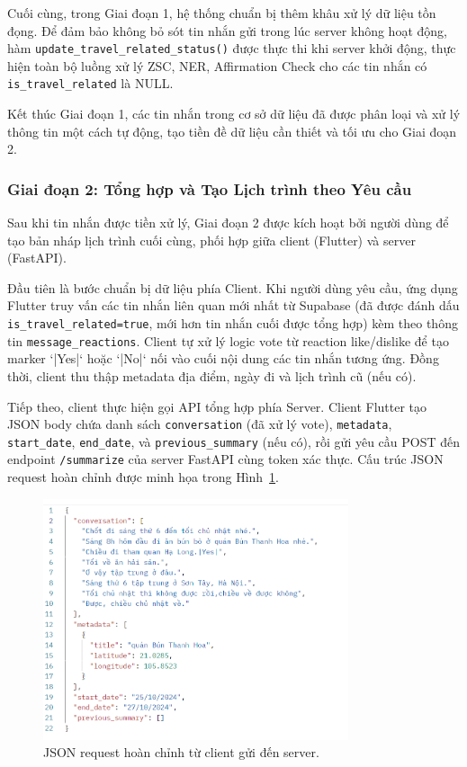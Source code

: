 Cuối cùng, trong Giai đoạn 1, hệ thống chuẩn bị thêm khâu xử lý dữ liệu tồn đọng. Để đảm bảo không bỏ sót tin nhắn gửi trong lúc server không hoạt động, hàm \texttt{update\_travel\_related\_status()} được thực thi khi server khởi động, thực hiện toàn bộ luồng xử lý ZSC, NER, Affirmation Check cho các tin nhắn có \texttt{is\_travel\_related} là NULL.

Kết thúc Giai đoạn 1, các tin nhắn trong cơ sở dữ liệu đã được phân loại và xử lý thông tin một cách tự động, tạo tiền đề dữ liệu cần thiết và tối ưu cho Giai đoạn 2.

\subsubsection{Giai đoạn 2: Tổng hợp và Tạo Lịch trình theo Yêu cầu}
\label{subsubsec:summary_phase2_revised}

Sau khi tin nhắn được tiền xử lý, Giai đoạn 2 được kích hoạt bởi người dùng để tạo bản nháp lịch trình cuối cùng, phối hợp giữa client (Flutter) và server (FastAPI).

Đầu tiên là bước chuẩn bị dữ liệu phía Client. Khi người dùng yêu cầu, ứng dụng Flutter truy vấn các tin nhắn liên quan mới nhất từ Supabase (đã được đánh dấu \texttt{is\_travel\_related=true}, mới hơn tin nhắn cuối được tổng hợp) kèm theo thông tin \texttt{message\_reactions}. Client tự xử lý logic vote từ reaction like/dislike để tạo marker `|Yes|` hoặc `|No|` nối vào cuối nội dung các tin nhắn tương ứng. Đồng thời, client thu thập metadata địa điểm, ngày đi và lịch trình cũ (nếu có).

Tiếp theo, client thực hiện gọi API tổng hợp phía Server. Client Flutter tạo JSON body chứa danh sách \texttt{conversation} (đã xử lý vote), \texttt{metadata}, \texttt{start\_date}, \texttt{end\_date}, và \texttt{previous\_summary} (nếu có), rồi gửi yêu cầu POST đến endpoint \texttt{/summarize} của server FastAPI cùng token xác thực. Cấu trúc JSON request hoàn chỉnh được minh họa trong Hình~\ref{fig:input}. %
    \begin{figure}[H]
        \centering
        \includegraphics[width=0.8\textwidth]{figures/c4/input.png}
        \caption{JSON request hoàn chỉnh từ client gửi đến server.}
        \label{fig:input}
    \end{figure}

